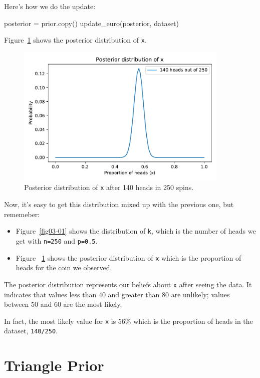 \documentclass[12pt]{book}
\theoremstyle{exercise}
\newcommand{\py}[1]{{\tt #1}}%
\begin{document}
Here's how we do the update:

\begin{code}
posterior = prior.copy()
update_euro(posterior, dataset)
\end{code}

Figure~\ref{fig03-02} shows the posterior distribution of \py{x}.

\begin{figure}
\centerline{\includegraphics[width=4in]{figs/fig03-02.pdf}}
\caption{Posterior distribution of \py{x} after 140 heads in 250 spins.}
\label{fig03-02}
\end{figure}

Now, it's easy to get this distribution mixed up with the previous one, but rememeber:

\begin{itemize}

\item Figure~\ref{fig03-01} shows the distribution of \py{k}, which is the number of heads we get with \py{n=250} and \py{p=0.5}.

\item Figure ~\ref{fig03-02} shows the posterior distribution of \py{x} which is the proportion of heads for the coin we observed.

\end{itemize}

The posterior distribution represents our beliefs about \py{x} after seeing the data.
It indicates that values less than 40 and greater than 80 are unlikely; values between 50 and 60 are the most likely.

In fact, the most likely value for \py{x} is 56\% which is the proportion of heads in the dataset, \py{140/250}.


\section{Triangle Prior}
\label{triangle}
\end{document}
